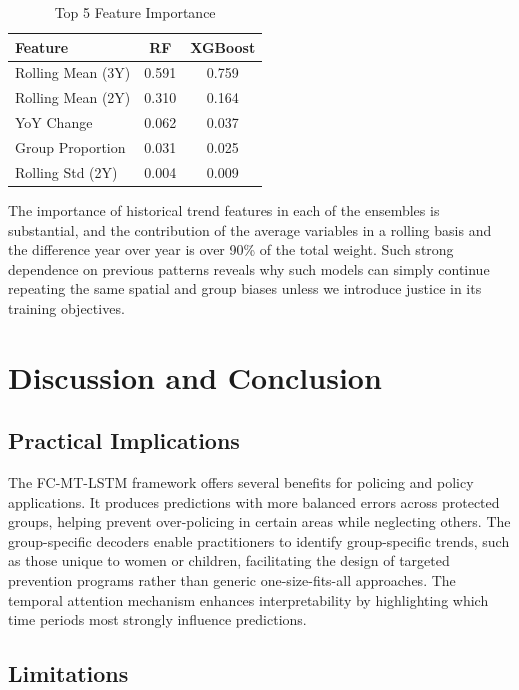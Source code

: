 \documentclass{svproc}
\newcommand{\modelname}{FC-MT-LSTM}
\begin{document}
\begin{table}[htbp]
\caption{Top 5 Feature Importance}
\label{tab:features}
\centering
\begin{tabular}{lcc}
\toprule
\textbf{Feature} & \textbf{RF} & \textbf{XGBoost} \\
\midrule
Rolling Mean (3Y) & 0.591 & 0.759 \\
Rolling Mean (2Y) & 0.310 & 0.164 \\
YoY Change & 0.062 & 0.037 \\
Group Proportion & 0.031 & 0.025 \\
Rolling Std (2Y) & 0.004 & 0.009 \\
\bottomrule
\end{tabular}
\end{table}

The importance of historical trend features in each of the ensembles is substantial, and the contribution of the average variables in a rolling basis and the difference year over year is over 90\% of the total weight. Such strong dependence on previous patterns reveals why such models can simply continue repeating the same spatial and group biases unless we introduce justice in its training objectives.

\section{Discussion and Conclusion}
\subsection{Practical Implications}

The \modelname{} framework offers several benefits for policing and policy applications. It produces predictions with more balanced errors across protected groups, helping prevent over-policing in certain areas while neglecting others. The group-specific decoders enable practitioners to identify group-specific trends, such as those unique to women or children, facilitating the design of targeted prevention programs rather than generic one-size-fits-all approaches. The temporal attention mechanism enhances interpretability by highlighting which time periods most strongly influence predictions.

\subsection{Limitations}
\end{document}

